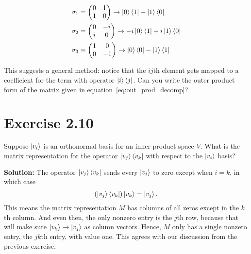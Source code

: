 \documentclass{book}
\begin{document}
    \begin{align}
    \begin{aligned}
        \sigma_1 &=
        \begin{pmatrix}
            0 & 1 \\
            1 & 0
        \end{pmatrix} \rightarrow
        \ket{0}\bra{1} + \ket{1}\bra{0} \\
        \sigma_2 &=
        \begin{pmatrix}
            0 & -i \\
            i & 0
        \end{pmatrix} \rightarrow
        -i \ket{0}\bra{1} + i \ket{1}\bra{0} \\
        \sigma_3 &=
        \begin{pmatrix}
            1 & 0 \\
            0 & -1
        \end{pmatrix} \rightarrow
        \ket{0}\bra{0} - \ket{1}\bra{1}
    \end{aligned}
    \end{align}
    
    This suggests a general method: notice that the $ij$th element gets mapped to a coefficient for the term with operator $\ket{i}\bra{j}$. Can you write the outer product form of the matrix given in equation~\eqref{eq:out_prod_decomp}?
    
\section*{Exercise 2.10}
    Suppose $\ket{v_i}$ is an orthonormal basis for an inner product space $V$. What is the matrix representation for the operator $\ket{v_j}\bra{v_k}$ with respect to the $\ket{v_i}$ basis?
    
    \textbf{Solution:} The operator $\ket{v_j}\bra{v_k}$ sends every $\ket{v_i}$ to zero except when $i = k$, in which case
    \begin{align}
        \left(\ket{v_j}\bra{v_k}\right) \ket{v_k} = \ket{v_j}.
    \end{align}
    This means the matrix representation $M$ has columns of all zeros except in the $k$th column. And even then, the only nonzero entry is the $j$th row, because that will make sure $\ket{v_k} \rightarrow \ket{v_j}$ as column vectors. Hence, $M$ only has a single nonzero entry, the $jk$th entry, with value one. This agrees with our discussion from the previous exercise. 
    
\end{document}
